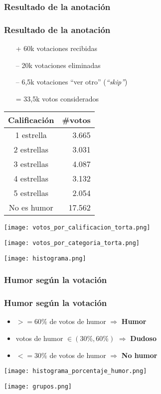 \subsubsection{Resultado de la anotación}
\begin{frame}[allowframebreaks]
    \frametitle{Resultado de la anotación}

    \begin{itemize}
        \item[+] 60k votaciones recibidas
        \item[--] 20k votaciones eliminadas
        \item[--] 6,5k votaciones “ver otro” (\emph{“skip”})
        \item[=] 33,5k votos considerados
    \end{itemize}

    \framebreak

    \begin{center}
        \begin{tabular}{ c | r }
            Calificación & \#votos \\
            \hline
            1 estrella & 3.665 \\
            2 estrellas & 3.031 \\
            3 estrellas & 4.087 \\
            4 estrellas & 3.132 \\
            5 estrellas & 2.054 \\
            No es humor & 17.562 \\
        \end{tabular}

        \texttt{[image: votos\_por\_calificacion\_torta.png]}

        \texttt{[image: votos\_por\_categoria\_torta.png]}

        \texttt{[image: histograma.png]}
    \end{center}
\end{frame}

\subsubsection{Humor según la votación}

\begin{frame}[allowframebreaks]
    \frametitle{Humor según la votación}

    \begin{itemize}
        \item $>= 60\%$ de votos de humor $\Rightarrow$ \textbf{Humor}
        \item votos de humor $\in (30\%, 60\%)$ $\Rightarrow$ \textbf{Dudoso}
        \item $<= 30\%$ de votos de humor $\Rightarrow$ \textbf{No humor}
    \end{itemize}

    \begin{center}
        \texttt{[image: histograma\_porcentaje\_humor.png]}

        \texttt{[image: grupos.png]}
    \end{center}
\end{frame}

